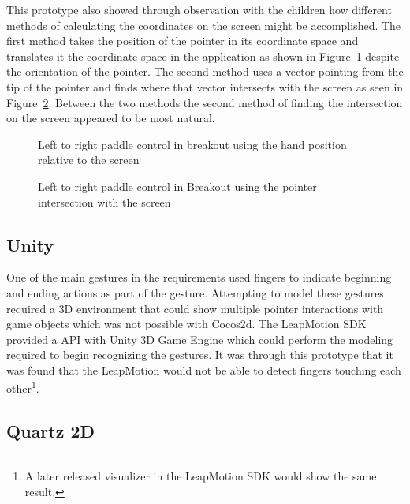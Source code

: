 This prototype also showed through observation with the children how different methods of calculating the coordinates on the screen might be accomplished. The first method takes the position of the pointer in its coordinate space and translates it the coordinate space in the application as shown in Figure~\ref{fig:HandPosition} despite the orientation of the pointer. The second method uses a vector pointing from the tip of the pointer and finds where that vector intersects with the screen as seen in Figure~\ref{fig:PointerIntersect}. Between the two methods the second method of finding the intersection on the screen appeared to be most natural. 

\begin{figure}
\centering     %
{}
\caption{Left to right paddle control in breakout using the hand position relative to the screen }
\label{fig:HandPosition}
\end{figure}

\begin{figure}
\centering     %
{}
\caption{Left to right paddle control in Breakout using the pointer intersection with the screen }
\label{fig:PointerIntersect}
\end{figure}

\subsection{Unity}\label{unity_prototype}
One of the main gestures in the requirements used fingers to indicate beginning and ending actions as part of the gesture. Attempting to model these gestures required a 3D environment that could show multiple pointer interactions with game objects which was not possible with Cocos2d. The LeapMotion SDK provided a API with Unity 3D Game Engine which could perform the modeling required to begin recognizing the gestures. It was through this prototype that it was found that the LeapMotion would not be able to detect fingers touching each other\footnote{A later released visualizer in the LeapMotion SDK would show the same result.}. \cite{unity}

\subsection{Quartz 2D}\label{quartz2d_prototype}

